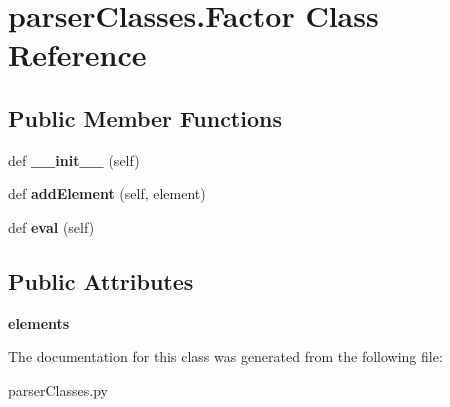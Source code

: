 \hypertarget{classparser_classes_1_1_factor}{}\section{parser\+Classes.\+Factor Class Reference}
\label{classparser_classes_1_1_factor}
\subsection*{Public Member Functions}
\begin{DoxyCompactItemize}
\item 
\mbox{\label{classparser_classes_1_1_factor_a50cc8e66fcea86b531bc0e490ded63f2}} 
def {\bfseries \+\_\+\+\_\+init\+\_\+\+\_\+} (self)
\item 
\mbox{\label{classparser_classes_1_1_factor_ad5d74ecd0f9ea5bf50e375cda5f57964}} 
def {\bfseries add\+Element} (self, element)
\item 
\mbox{\label{classparser_classes_1_1_factor_a5d9064846ca5c7367ab0b0bcfb200774}} 
def {\bfseries eval} (self)
\end{DoxyCompactItemize}
\subsection*{Public Attributes}
\begin{DoxyCompactItemize}
\item 
\mbox{\label{classparser_classes_1_1_factor_ad5f90e3a7a1ebaa63f456d499e4d05f5}} 
{\bfseries elements}
\end{DoxyCompactItemize}


The documentation for this class was generated from the following file\+:\begin{DoxyCompactItemize}
\item 
parser\+Classes.\+py\end{DoxyCompactItemize}
